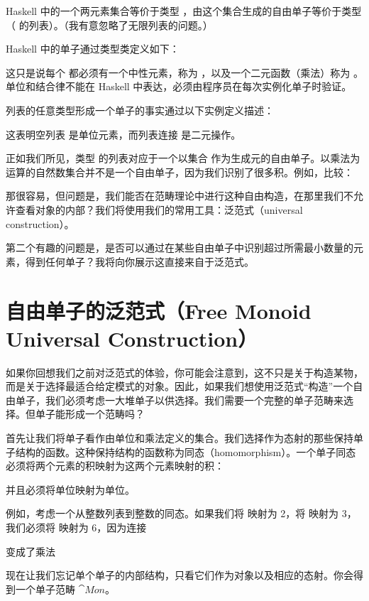 Haskell 中的一个两元素集合等价于类型 ，由这个集合生成的自由单子等价于类型 \code{{[}Bool{]}}（ 的列表）。（我有意忽略了无限列表的问题。）

Haskell 中的单子通过类型类定义如下：

这只是说每个  都必须有一个中性元素，称为 ，以及一个二元函数（乘法）称为 。单位和结合律不能在 Haskell 中表达，必须由程序员在每次实例化单子时验证。

列表的任意类型形成一个单子的事实通过以下实例定义描述：

这表明空列表 \code{{[}{]}} 是单位元素，而列表连接 \code{(++)} 是二元操作。

正如我们所见，类型  的列表对应于一个以集合  作为生成元的自由单子。以乘法为运算的自然数集合并不是一个自由单子，因为我们识别了很多积。例如，比较：

那很容易，但问题是，我们能否在范畴理论中进行这种自由构造，在那里我们不允许查看对象的内部？我们将使用我们的常用工具：泛范式（universal construction）。

第二个有趣的问题是，是否可以通过在某些自由单子中识别超过所需最小数量的元素，得到任何单子？我将向你展示这直接来自于泛范式。

\section{自由单子的泛范式（Free Monoid Universal Construction）}

如果你回想我们之前对泛范式的体验，你可能会注意到，这不只是关于构造某物，而是关于选择最适合给定模式的对象。因此，如果我们想使用泛范式“构造”一个自由单子，我们必须考虑一大堆单子以供选择。我们需要一个完整的单子范畴来选择。但单子能形成一个范畴吗？

首先让我们将单子看作由单位和乘法定义的集合。我们选择作为态射的那些保持单子结构的函数。这种保持结构的函数称为同态（homomorphism）。一个单子同态必须将两个元素的积映射为这两个元素映射的积：

并且必须将单位映射为单位。

例如，考虑一个从整数列表到整数的同态。如果我们将 \code{{[}2{]}} 映射为 2，将 \code{{[}3{]}} 映射为 3，我们必须将 \code{{[}2, 3{]}} 映射为 6，因为连接

变成了乘法

现在让我们忘记单个单子的内部结构，只看它们作为对象以及相应的态射。你会得到一个单子范畴 $\cat{Mon}$。


